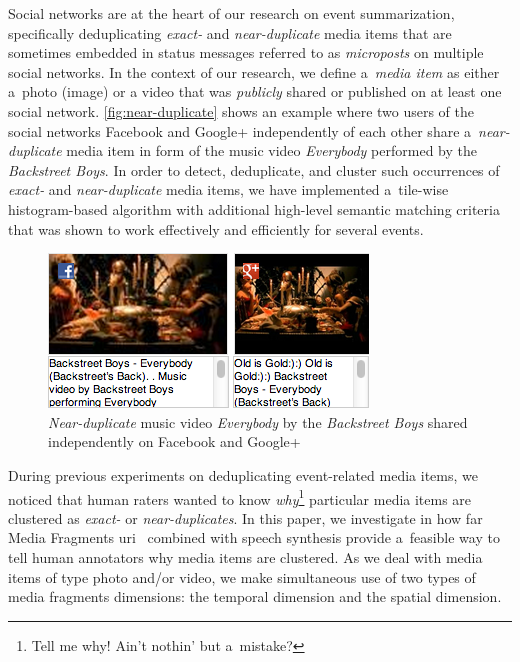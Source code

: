 \documentclass{article}
\begin{document}
Social networks are at the heart of our research on event summarization, specifically deduplicating \emph{exact-} and \emph{near-duplicate} media items that are sometimes embedded in status messages referred to as \emph{microposts} on multiple social networks. In the context of our research, we define a~\emph{media item} as either a~photo (image) or a video that was \emph{publicly} shared or published on at least one social network. \autoref{fig:near-duplicate} shows an example where two users of the social networks Facebook and Google+ independently of each other share a~\emph{near-duplicate} media item in form of the music video \emph{Everybody} performed by the \emph{Backstreet Boys}. In order to detect, deduplicate, and cluster such occurrences of \emph{exact-} and \emph{near-duplicate} media items, we have implemented a~tile-wise histogram-based algorithm with additional high-level semantic matching criteria that was shown to work effectively and efficiently for several events.

\begin{figure}[b!]
  \centering
  \includegraphics[width=0.9\linewidth]{./backstreetboys.png}
  \caption{\emph{Near-duplicate} music video \emph{Everybody} by the \emph{Backstreet Boys} shared independently on Facebook and Google+}
  \label{fig:near-duplicate}
\end{figure}

During previous experiments on deduplicating event-related media items, we noticed that human raters wanted to know \emph{why}\footnote{Tell me why! Ain't nothin' but a~mistake?} particular media items are clustered as \emph{exact-} or \emph{near-duplicates}. In this paper, we investigate in how far
Media Fragments {\sc uri}~\cite{troncy2012mediafragments} combined with speech synthesis provide a~feasible way to tell human annotators why media items are clustered. As we deal with media items of type photo and/or video, we make simultaneous use of two types of media fragments dimensions: the temporal dimension and the spatial dimension.
\end{document}
